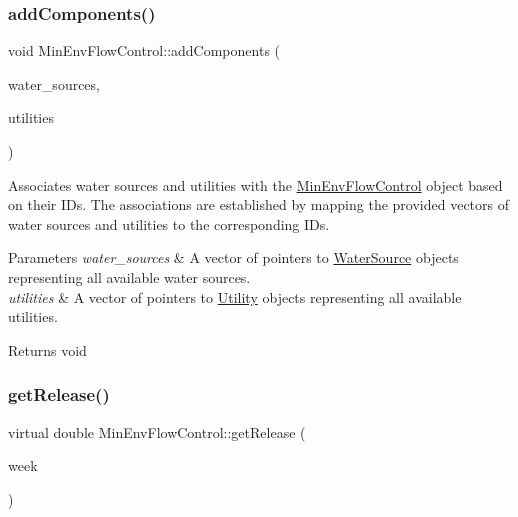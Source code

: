 \subsubsection{\texorpdfstring{add\+Components()}{addComponents()}}
{\footnotesize\ttfamily void Min\+Env\+Flow\+Control\+::add\+Components (\begin{DoxyParamCaption}\item[{vector$<$ \mbox{\hyperlink{classWaterSource}{Water\+Source}} $\ast$$>$}]{water\+\_\+sources,  }\item[{vector$<$ \mbox{\hyperlink{classUtility}{Utility}} $\ast$$>$}]{utilities }\end{DoxyParamCaption})}



Associates water sources and utilities with the {\ttfamily \mbox{\hyperlink{classMinEnvFlowControl}{Min\+Env\+Flow\+Control}}} object based on their I\+Ds. The associations are established by mapping the provided vectors of water sources and utilities to the corresponding I\+Ds. 


\begin{DoxyParams}{Parameters}
{\em water\+\_\+sources} & A vector of pointers to {\ttfamily \mbox{\hyperlink{classWaterSource}{Water\+Source}}} objects representing all available water sources. \\
\hline
{\em utilities} & A vector of pointers to {\ttfamily \mbox{\hyperlink{classUtility}{Utility}}} objects representing all available utilities.\\
\hline
\end{DoxyParams}
\begin{DoxyReturn}{Returns}
void 
\end{DoxyReturn}
\mbox{\label{classMinEnvFlowControl_a5de79615852eb0c937dd559a9eb9402d}} 
\subsubsection{\texorpdfstring{get\+Release()}{getRelease()}}
{\footnotesize\ttfamily virtual double Min\+Env\+Flow\+Control\+::get\+Release (\begin{DoxyParamCaption}\item[{int}]{week }\end{DoxyParamCaption})\hspace{0.3cm}{\ttfamily [pure virtual]}}



